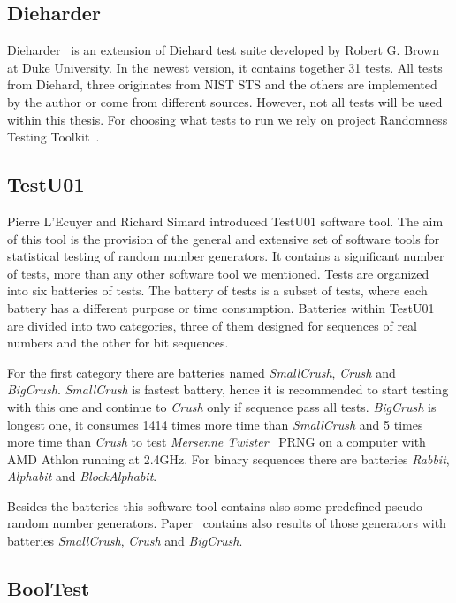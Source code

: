 \documentclass[
    digital,    %
    oneside,    %
    color,
    11pt,
    nocover,
    notable,
    nolof,
    nolot,
    final
]{fithesis3}
\renewcommand\_{\textunderscore\allowbreak}
\begin{document}
\subsection{Dieharder}

Dieharder~\cite{dieharder} is an extension of Diehard test suite \cite{diehard} developed by Robert G. Brown at Duke University. In the newest version, it contains together 31 tests. All tests from Diehard, three originates from NIST STS and the others are implemented by the author or come from different sources. However, not all tests will be used within this thesis. For choosing what tests to run we rely on project Randomness Testing Toolkit~\cite{Obratil2017thesis}.

\subsection{TestU01}

Pierre L'Ecuyer and Richard Simard introduced TestU01 software tool. The aim of this tool is the provision of the general and extensive set of software tools for statistical testing of random number generators. It contains a significant number of tests, more than any other software tool we mentioned. Tests are organized into six batteries of tests. The battery of tests is a subset of tests, where each battery has a different purpose or time consumption. Batteries within TestU01 are divided into two categories, three of them designed for sequences of real numbers and the other for bit sequences.

For the first category there are batteries named \textit{SmallCrush}, \textit{Crush} and \textit{BigCrush}. \textit{SmallCrush} is fastest battery, hence it is recommended to start testing with this one and continue to \textit{Crush} only if sequence pass all tests. \textit{BigCrush} is longest one, it consumes 1414 times more time than \textit{SmallCrush} and 5 times more time than \textit{Crush} to test \textit{Mersenne Twister}~\cite{Matsumoto:1998:MTE:272991.272995} PRNG on a computer with AMD Athlon running at 2.4GHz. For binary sequences there are batteries \textit{Rabbit}, \textit{Alphabit} and \textit{BlockAlphabit}. \cite{l2007testu01}

Besides the batteries this software tool contains also some predefined pseudo-random number generators. Paper~\cite{l2007testu01} contains also results of those generators with batteries \textit{SmallCrush}, \textit{Crush} and \textit{BigCrush}.

\subsection{BoolTest}
\end{document}
